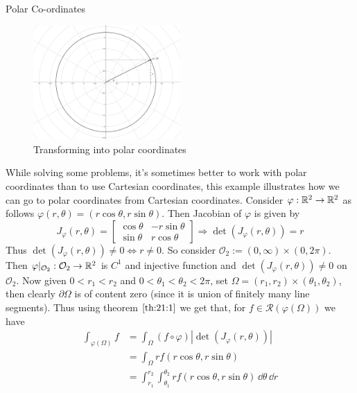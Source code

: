 \documentclass[../Analysis-3]{subfiles}
\begin{document}
\begin{Eg}{Polar Co-ordinates}{}
    \begin{figure}
        \centering
        \includegraphics[width=0.5\textwidth]{../figures/lec21.1.png}
        \caption{Transforming into polar coordinates}
        \label{fig1:21}
    \end{figure}
    While solving some problems, it's sometimes better to work with polar coordinates than to use Cartesian coordinates, this example illustrates how we can go to polar coordinates from Cartesian coordinates.
    Consider $\varphi : \mathbb{R}^2 \to \mathbb{R}^2$ as follows $\varphi(r,\theta) = (r \cos\theta, r \sin\theta)$. Then Jacobian of $\varphi$ is given by
    \[
        J_{\varphi}(r,\theta) = \begin{bmatrix}
            \cos\theta & -r\sin\theta \\
            \sin\theta & r\cos\theta
        \end{bmatrix} \Rightarrow \det(J_{\varphi}(r,\theta)) = r
    \]
    Thus $\det(J_{\varphi}(r,\theta)) \neq 0 \Leftrightarrow r \neq 0$. So consider $\mathcal{O}_2 := (0,\infty) \times (0,2\pi)$. Then $\varphi\vert_{\mathcal{O}_2} : \mathcal{O}_2 \to \mathbb{R}^2$ is $C^1$ and injective function and $\det(J_{\varphi}(r,\theta)) \neq 0 $ on $\mathcal{O}_2$. Now given $0 < r_1 < r_2$ and $0 < \theta_1 < \theta_2 < 2\pi$, set $\Omega = (r_1, r_2) \times (\theta_1, \theta_2)$, then clearly $\partial \Omega$ is of content zero (since it is union of finitely many line segments). Thus using theorem $\ref{th:21:1}$ we get that, for $f \in \mathscr{R}(\varphi(\Omega))$ we have
    \begin{align*}
        \int_{\varphi(\Omega)} f & = \int_{\Omega} (f \circ \varphi) |\det (J_{\varphi}(r,\theta))|                                 \\
                                 & = \int_{\Omega} r f(r\cos\theta, r\sin\theta)                                                    \\
                                 & = \int_{r_1}^{r_2} \int_{\theta_1}^{\theta_2} r f(r\cos\theta, r\sin\theta)\, \dd\theta \, \dd r
    \end{align*}


\end{Eg}
\end{document}
